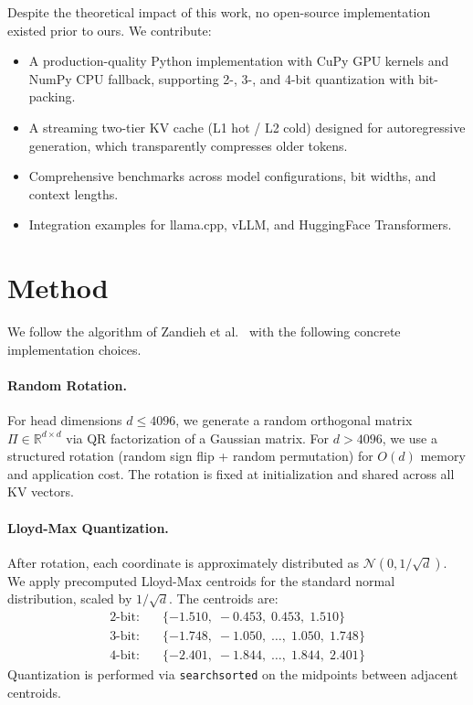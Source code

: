 \documentclass{article}
\begin{document}
Despite the theoretical impact of this work, no open-source implementation
existed prior to ours.  We contribute:
\begin{itemize}
  \item A production-quality Python implementation with CuPy GPU kernels
    and NumPy CPU fallback, supporting 2-, 3-, and 4-bit quantization with
    bit-packing.
  \item A streaming two-tier KV cache (L1 hot / L2 cold) designed for
    autoregressive generation, which transparently compresses older tokens.
  \item Comprehensive benchmarks across model configurations, bit widths,
    and context lengths.
  \item Integration examples for llama.cpp, vLLM, and HuggingFace
    Transformers.
\end{itemize}

\section{Method}
\label{sec:method}

We follow the algorithm of Zandieh et al.~\cite{zandieh2026sublinear}
with the following concrete implementation choices.

\paragraph{Random Rotation.}
For head dimensions $d \leq 4096$, we generate a random orthogonal matrix
$\Pi \in \mathbb{R}^{d \times d}$ via QR factorization of a Gaussian
matrix.  For $d > 4096$, we use a structured rotation (random sign flip +
random permutation) for $O(d)$ memory and application cost.  The rotation
is fixed at initialization and shared across all KV vectors.

\paragraph{Lloyd-Max Quantization.}
After rotation, each coordinate is approximately distributed as
$\mathcal{N}(0, 1/\sqrt{d})$.  We apply precomputed Lloyd-Max centroids
for the standard normal distribution, scaled by $1/\sqrt{d}$.  The
centroids are:
\begin{align}
  \text{2-bit:} &\quad \{-1.510,\; -0.453,\; 0.453,\; 1.510\} \\
  \text{3-bit:} &\quad \{-1.748,\; -1.050,\; \ldots,\; 1.050,\; 1.748\} \\
  \text{4-bit:} &\quad \{-2.401,\; -1.844,\; \ldots,\; 1.844,\; 2.401\}
\end{align}
Quantization is performed via \texttt{searchsorted} on the midpoints
between adjacent centroids.
\end{document}
